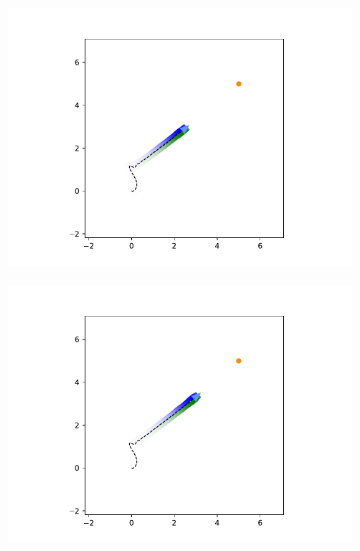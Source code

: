 \documentclass[main.tex]{subfiles}
\begin{document}
\begin{figure}[h]
    \begin{subfigure}{0.20\textwidth}
        \centering
        \includegraphics[width=\textwidth]{figures/Simulations/sim1/frame_5.pdf}
    \end{subfigure}%
    \hfill
    \begin{subfigure}{0.20\textwidth}
        \centering
        \includegraphics[width=\textwidth]{figures/Simulations/sim1/frame_6.pdf}
    \end{subfigure}%
    \hfill
    \begin{subfigure}{0.20\textwidth}
        \centering

\end{subfigure}
\end{figure}
\end{document}
